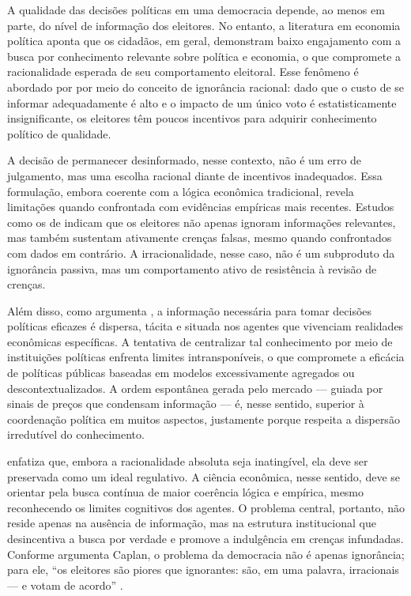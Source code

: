 
A qualidade das decisões políticas em uma democracia depende, ao menos em parte, do nível de informação dos eleitores. No entanto, a literatura em economia política aponta que os cidadãos, em geral, demonstram baixo engajamento com a busca por conhecimento relevante sobre política e economia, o que compromete a racionalidade esperada de seu comportamento eleitoral. Esse fenômeno é abordado por  por meio do conceito de ignorância racional: dado que o custo de se informar adequadamente é alto e o impacto de um único voto é estatisticamente insignificante, os eleitores têm poucos incentivos para adquirir conhecimento político de qualidade.

A decisão de permanecer desinformado, nesse contexto, não é um erro de julgamento, mas uma escolha racional diante de incentivos inadequados. Essa formulação, embora coerente com a lógica econômica tradicional, revela limitações quando confrontada com evidências empíricas mais recentes. Estudos como os de  indicam que os eleitores não apenas ignoram informações relevantes, mas também sustentam ativamente crenças falsas, mesmo quando confrontados com dados em contrário. A irracionalidade, nesse caso, não é um subproduto da ignorância passiva, mas um comportamento ativo de resistência à revisão de crenças.

Além disso, como argumenta , a informação necessária para tomar decisões políticas eficazes é dispersa, tácita e situada nos agentes que vivenciam realidades econômicas específicas. A tentativa de centralizar tal conhecimento por meio de instituições políticas enfrenta limites intransponíveis, o que compromete a eficácia de políticas públicas baseadas em modelos excessivamente agregados ou descontextualizados. A ordem espontânea gerada pelo mercado — guiada por sinais de preços que condensam informação — é, nesse sentido, superior à coordenação política em muitos aspectos, justamente porque respeita a dispersão irredutível do conhecimento.

 enfatiza que, embora a racionalidade absoluta seja inatingível, ela deve ser preservada como um ideal regulativo. A ciência econômica, nesse sentido, deve se orientar pela busca contínua de maior coerência lógica e empírica, mesmo reconhecendo os limites cognitivos dos agentes. O problema central, portanto, não reside apenas na ausência de informação, mas na estrutura institucional que desincentiva a busca por verdade e promove a indulgência em crenças infundadas. Conforme argumenta Caplan, o problema da democracia não é apenas ignorância; para ele, ``os eleitores são piores que ignorantes: são, em uma palavra, irracionais — e votam de acordo'' \cite[p.~2]{The_Myth_of_the_Rational_Voter}.

